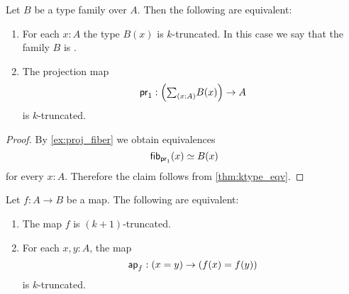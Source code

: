 \begin{thm}
Let $B$ be a type family over $A$. Then the following are equivalent:
\begin{enumerate}
\item For each $x:A$ the type $B(x)$ is $k$-truncated. In this case we say that the family $B$ is .
\item The projection map
\begin{equation*}
\proj 1 : \Big(\sm{x:A}B(x)\Big)\to A
\end{equation*}
is $k$-truncated.
\end{enumerate}
\end{thm}

\begin{proof}
By \cref{ex:proj_fiber} we obtain equivalences
\begin{equation*}
\eqv{\fib{\proj 1}{x}}{B(x)}
\end{equation*}
for every $x:A$. Therefore the claim follows from \cref{thm:ktype_eqv}.
\end{proof}

\begin{thm}\label{thm:trunc_ap}
Let $f:A\to B$ be a map. The following are equivalent:
\begin{enumerate}
\item The map $f$ is $(k+1)$-truncated.
\item For each $x,y:A$, the map
\begin{equation*}
\mathsf{ap}_{f} : (x=y)\to (f(x)=f(y))
\end{equation*}
is $k$-truncated. 
\end{enumerate}
\end{thm}


